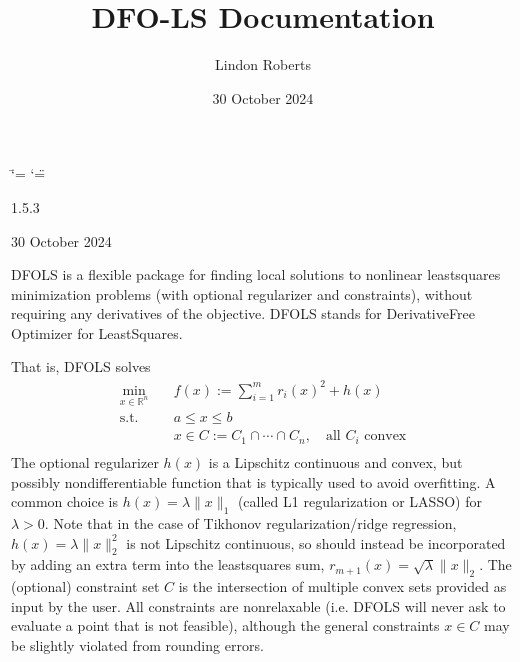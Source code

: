 \documentclass[letterpaper,10pt,english]{sphinxmanual}
\title{DFO-LS Documentation}
\date{30 October 2024}
\author{Lindon Roberts}
\begin{document}
\ifdefined\shorthandoff
  \ifnum\catcode`\=\string=\active\shorthandoff{=}\fi
  \ifnum\catcode`\"=\active{}\fi
\fi

\pagestyle{empty}
\sphinxmaketitle
\pagestyle{plain}
\sphinxtableofcontents
\pagestyle{normal}
\label{\detokenize{index::doc}}


\sphinxAtStartPar
{} 1.5.3

\sphinxAtStartPar
{} 30 October 2024

\sphinxAtStartPar
{} 

\sphinxAtStartPar
DFO\sphinxhyphen{}LS is a flexible package for finding local solutions to nonlinear least\sphinxhyphen{}squares minimization problems (with optional regularizer and constraints), without requiring any derivatives of the objective. DFO\sphinxhyphen{}LS stands for Derivative\sphinxhyphen{}Free Optimizer for Least\sphinxhyphen{}Squares.

\sphinxAtStartPar
That is, DFO\sphinxhyphen{}LS solves
\begin{equation*}
\begin{split}\min_{x\in\mathbb{R}^n}  &\quad  f(x) := \sum_{i=1}^{m}r_{i}(x)^2 + h(x) \\
\text{s.t.} &\quad  a \leq x \leq b\\
            &\quad x \in C := C_1 \cap \cdots \cap C_n, \quad \text{all $C_i$ convex}\\\end{split}
\end{equation*}
\sphinxAtStartPar
The optional regularizer \(h(x)\) is a Lipschitz continuous and convex, but possibly non\sphinxhyphen{}differentiable function that is typically used to avoid overfitting.
A common choice is \(h(x)=\lambda \|x\|_1\) (called L1 regularization or LASSO) for \(\lambda>0\).
Note that in the case of Tikhonov regularization/ridge regression, \(h(x)=\lambda\|x\|_2^2\) is not Lipschitz continuous, so should instead be incorporated by adding an extra term into the least\sphinxhyphen{}squares sum, \(r_{m+1}(x)=\sqrt{\lambda} \|x\|_2\).
The (optional) constraint set \(C\) is the intersection of multiple convex sets provided as input by the user. All constraints are non\sphinxhyphen{}relaxable (i.e. DFO\sphinxhyphen{}LS will never ask to evaluate a point that is not feasible), although the general constraints \(x\in C\) may be slightly violated from rounding errors.
\end{document}

